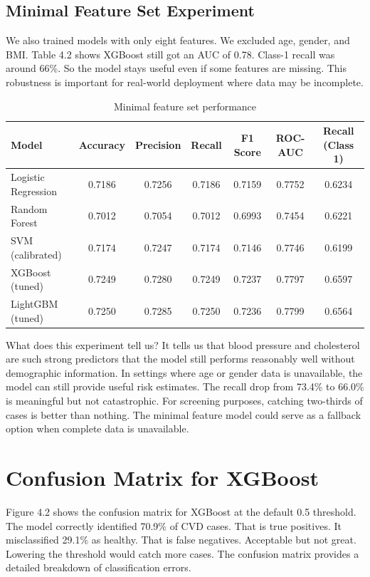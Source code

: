\documentclass[12pt, a4paper, oneside]{book}
\begin{document}
\subsection{Minimal Feature Set Experiment}
We also trained models with only eight features. We excluded age, gender, and BMI. Table 4.2 shows XGBoost still got an AUC of 0.78. Class-1 recall was around 66\%. So the model stays useful even if some features are missing. This robustness is important for real-world deployment where data may be incomplete.

\begin{table}[H]
\centering
{}
\renewcommand{\arraystretch}{1.1}
\caption{Minimal feature set performance}
\label{tab:model_performance_minimal}
\small
\begin{tabular}{l S[table-format=1.4] S[table-format=1.4] S[table-format=1.4] S[table-format=1.4] S[table-format=1.4] S[table-format=1.4]}
\toprule
Model & {Accuracy} & {Precision} & {Recall} & {F1 Score} & {ROC-AUC} & {Recall (Class 1)} \\
\midrule
Logistic Regression & 0.7186 & 0.7256 & 0.7186 & 0.7159 & 0.7752 & 0.6234 \\
Random Forest       & 0.7012 & 0.7054 & 0.7012 & 0.6993 & 0.7454 & 0.6221 \\
SVM (calibrated)    & 0.7174 & 0.7247 & 0.7174 & 0.7146 & 0.7746 & 0.6199 \\
XGBoost (tuned)     & 0.7249 & 0.7280 & 0.7249 & 0.7237 & 0.7797 & 0.6597 \\
LightGBM (tuned)    & 0.7250 & 0.7285 & 0.7250 & 0.7236 & 0.7799 & 0.6564 \\
\bottomrule
\end{tabular}
\end{table}

What does this experiment tell us? It tells us that blood pressure and cholesterol are such strong predictors that the model still performs reasonably well without demographic information. In settings where age or gender data is unavailable, the model can still provide useful risk estimates. The recall drop from 73.4\% to 66.0\% is meaningful but not catastrophic. For screening purposes, catching two-thirds of cases is better than nothing. The minimal feature model could serve as a fallback option when complete data is unavailable.

\section{Confusion Matrix for XGBoost}
Figure 4.2 shows the confusion matrix for XGBoost at the default 0.5 threshold. The model correctly identified 70.9\% of CVD cases. That is true positives. It misclassified 29.1\% as healthy. That is false negatives. Acceptable but not great. Lowering the threshold would catch more cases. The confusion matrix provides a detailed breakdown of classification errors.
\end{document}
